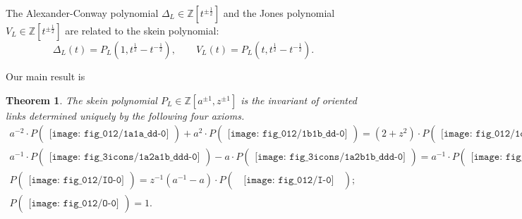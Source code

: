 \documentclass[12pt]{amsart}
\newtheorem{thm}{Theorem}[section]
\theoremstyle{definition}
\theoremstyle{remark}
\begin{document}
The Alexander-Conway polynomial $\Delta_L \in \mathbb Z[t^{\pm\frac12}]$ and
the Jones polynomial $V_L \in \mathbb Z[t^{\pm\frac12}]$ are related to the skein polynomial:
\[
\Delta_L(t)=P_L(1,t^{\frac12}-t^{-\frac12}),
\qquad
V_L(t)=P_L(t,t^{\frac12}-t^{-\frac12}).
\]

Our main result is

\begin{thm}
\label{thm:HOMFLY}
The skein polynomial $P_L \in \mathbb Z[a^{\pm1},z^{\pm1}]$ is
the invariant of oriented links
determined uniquely by the following four axioms.
{\allowdisplaybreaks
\begin{gather*}
a^{-2}\cdot P
\begin{pmatrix}
\texttt{[image: fig\_012/1a1a\_dd-0]}
\end{pmatrix}
+a^2\cdot P
\begin{pmatrix}
\texttt{[image: fig\_012/1b1b\_dd-0]}
\end{pmatrix}
=(2+z^2)
\cdot P
\begin{pmatrix}
\texttt{[image: fig\_012/1oo\_dd-0]}
\end{pmatrix} ;
\tag*{\rm(II)}
\\
a^{-1}\cdot P
\begin{pmatrix}
\texttt{[image: fig\_3icons/1a2a1b\_ddd-0]}
\end{pmatrix}
-a\cdot P
\begin{pmatrix}
\texttt{[image: fig\_3icons/1a2b1b\_ddd-0]}
\end{pmatrix}
=
a^{-1}\cdot P
\begin{pmatrix}
\texttt{[image: fig\_3icons/1b2a1a\_ddd-0]}
\end{pmatrix}
-a\cdot P
\begin{pmatrix}
\texttt{[image: fig\_3icons/1b2b1a\_ddd-0]}
\end{pmatrix} ;
\tag*{\rm(III)}
\\
P
\begin{pmatrix}
\texttt{[image: fig\_012/IO-0]}
\end{pmatrix}
=z^{-1}(a^{-1}-a)\cdot
P
\begin{pmatrix}
\;\;
\texttt{[image: fig\_012/I-0]}
\;\;
\end{pmatrix} ;
\tag*{\rm(IO)}
\\
P
\begin{pmatrix}
\texttt{[image: fig\_012/O-0]}
\end{pmatrix}
=1 .
\tag*{\rm(O)}
\end{gather*}
}
\end{thm}
\end{document}
